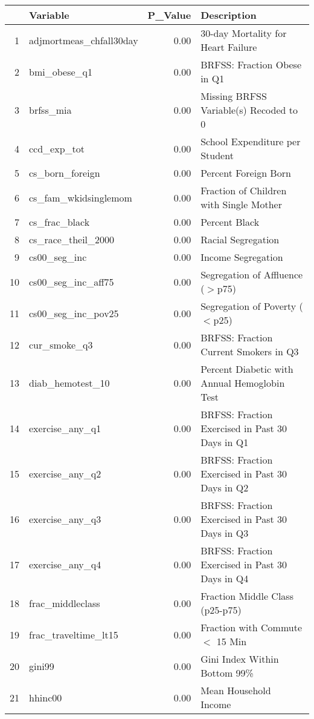 \begin{table}[ht]
\centering
\begin{tabular}{rlrl}
  \hline
 & Variable & P\_Value & Description \\ 
  \hline
1 & adjmortmeas\_chfall30day & 0.00 & 30-day Mortality for Heart Failure \\ 
  2 & bmi\_obese\_q1 & 0.00 & BRFSS: Fraction Obese in Q1 \\ 
  3 & brfss\_mia & 0.00 & Missing BRFSS Variable(s) Recoded to 0 \\ 
  4 & ccd\_exp\_tot & 0.00 & School Expenditure per Student \\ 
  5 & cs\_born\_foreign & 0.00 & Percent Foreign Born \\ 
  6 & cs\_fam\_wkidsinglemom & 0.00 & Fraction of Children with Single Mother \\ 
  7 & cs\_frac\_black & 0.00 & Percent Black \\ 
  8 & cs\_race\_theil\_2000 & 0.00 & Racial Segregation \\ 
  9 & cs00\_seg\_inc & 0.00 & Income Segregation \\ 
  10 & cs00\_seg\_inc\_aff75 & 0.00 & Segregation of Affluence ($>$p75) \\ 
  11 & cs00\_seg\_inc\_pov25 & 0.00 & Segregation of Poverty ($<$p25) \\ 
  12 & cur\_smoke\_q3 & 0.00 & BRFSS: Fraction Current Smokers in Q3 \\ 
  13 & diab\_hemotest\_10 & 0.00 & Percent Diabetic with Annual Hemoglobin Test \\ 
  14 & exercise\_any\_q1 & 0.00 & BRFSS: Fraction Exercised in Past 30 Days in Q1 \\ 
  15 & exercise\_any\_q2 & 0.00 & BRFSS: Fraction Exercised in Past 30 Days in Q2 \\ 
  16 & exercise\_any\_q3 & 0.00 & BRFSS: Fraction Exercised in Past 30 Days in Q3 \\ 
  17 & exercise\_any\_q4 & 0.00 & BRFSS: Fraction Exercised in Past 30 Days in Q4 \\ 
  18 & frac\_middleclass & 0.00 & Fraction Middle Class (p25-p75) \\ 
  19 & frac\_traveltime\_lt15 & 0.00 & Fraction with Commute $<$ 15 Min \\ 
  20 & gini99 & 0.00 & Gini Index Within Bottom 99\% \\ 
  21 & hhinc00 & 0.00 & Mean Household Income \\ 

\end{tabular}
\end{table}
